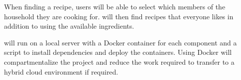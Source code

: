 \documentclass[../CHEFCookingHelperForEveryonesFridge.tex]{subfiles}
\begin{document}
When finding a recipe, users will be able to select which members of the household they are cooking for.
\chef{} will then find recipes that everyone likes in addition to using the available ingredients.


\chef{} will run on a local server with a Docker container for each component and a script to install dependencies and deploy the containers.
Using Docker will compartmentalize the project and reduce the work required to transfer to a hybrid cloud environment if required.
\end{document}
